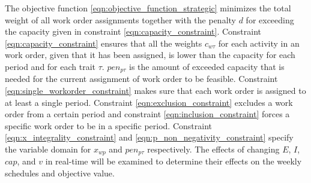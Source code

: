 \documentclass[preprint,12pt,authoryear]{elsarticle}
\begin{document}


The objective function \eqref{eqn:objective_function_strategic} minimizes the total weight of all work order assignments together with the penalty $d$ for exceeding the capacity given in constraint \eqref{eqn:capacity_constraint}. Constraint \eqref{eqn:capacity_constraint} ensures that all the weights $c_{w\tau}$ for each activity in an work order, given that it has been assigned, is lower than the capacity for each period and for each trait $\tau$. $pen_{p\tau}$ is the amount of exceeded capacity that is needed for the current assignment of work order to be feasible. Constraint \eqref{eqn:single_workorder_constraint} makes sure that each work order is assigned to at least a single period. Constraint \eqref{eqn:exclusion_constraint} excludes a work order from a certain period and constraint \eqref{eqn:inclusion_constraint} forces a specific work order to be in a specific period. Constraint \eqref{eqn:x_integrality_constraint} and \eqref{eqn:p_non_negativity_constraint} specify the variable domain for $x_{wp}$ and $pen_{p\tau}$ respectively. The effects of changing $E$, $I$, $cap$, and $v$ in real-time will be examined to determine their effects on the weekly schedules and objective value.
\end{document}

